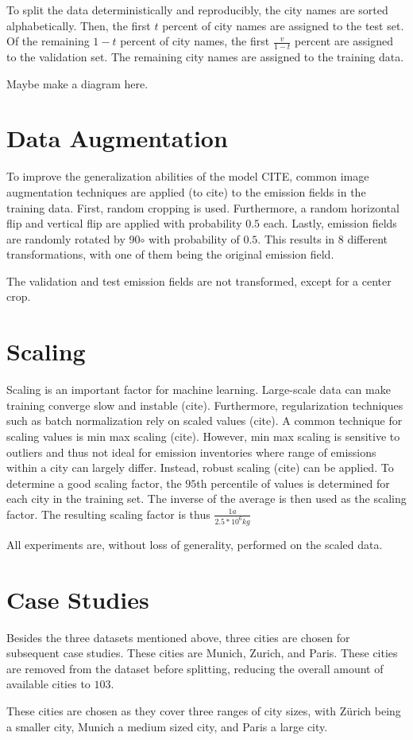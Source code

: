 To split the data deterministically and reproducibly, the city names are sorted alphabetically.
Then, the first $t$ percent of city names are assigned to the test set.
Of the remaining $1 - t$ percent of city names, the first $\frac{v}{1 - t}$ percent are assigned to the validation set.
The remaining city names are assigned to the training data.

Maybe make a diagram here.

\section{Data Augmentation}
To improve the generalization abilities of the model CITE, common image augmentation techniques are applied (to cite) to the emission fields in the training data.
First, random cropping is used.
Furthermore, a random horizontal flip and vertical flip are applied with probability $0.5$ each.
Lastly, emission fields are randomly rotated by 90$\circ$ with probability of $0.5$.
This results in $8$ different transformations, with one of them being the original emission field.

The validation and test emission fields are not transformed, except for a center crop.

\section{Scaling}
Scaling is an important factor for machine learning.
Large-scale data can make training converge slow and instable (cite).
Furthermore, regularization techniques such as batch normalization \parencite{BatchNorm} rely on scaled values (cite).
A common technique for scaling values is min max scaling (cite).
However, min max scaling is sensitive to outliers and thus not ideal for emission inventories where range of emissions within a city can largely differ.
Instead, robust scaling (cite) can be applied.
To determine a good scaling factor, the $95$th percentile of values is determined for each city in the training set.
The inverse of the average is then used as the scaling factor.
The resulting scaling factor is thus $\frac{1 a}{2.5 * 10^6 kg}$

All experiments are, without loss of generality, performed on the scaled data.

\section{Case Studies}
Besides the three datasets mentioned above, three cities are chosen for subsequent case studies.
These cities are Munich, Zurich, and Paris.
These cities are removed from the dataset before splitting, reducing the overall amount of available cities to $103$.

These cities are chosen as they cover three ranges of city sizes, with Zürich being a smaller city, Munich a medium sized city, and Paris a large city.

